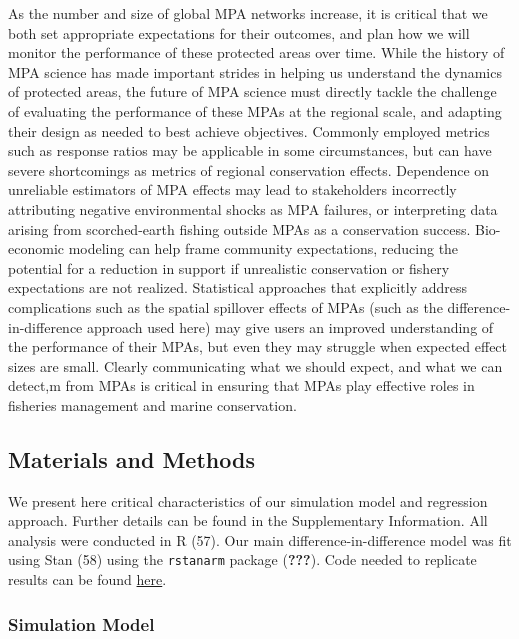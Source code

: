 \documentclass[9pt,twocolumn,twoside,lineno]{pnas-new}
\begin{document}
As the number and size of global MPA networks increase, it is critical
that we both set appropriate expectations for their outcomes, and plan
how we will monitor the performance of these protected areas over time.
While the history of MPA science has made important strides in helping
us understand the dynamics of protected areas, the future of MPA science
must directly tackle the challenge of evaluating the performance of
these MPAs at the regional scale, and adapting their design as needed to
best achieve objectives. Commonly employed metrics such as response
ratios may be applicable in some circumstances, but can have severe
shortcomings as metrics of regional conservation effects. Dependence on
unreliable estimators of MPA effects may lead to stakeholders
incorrectly attributing negative environmental shocks as MPA failures,
or interpreting data arising from scorched-earth fishing outside MPAs as
a conservation success. Bio-economic modeling can help frame community
expectations, reducing the potential for a reduction in support if
unrealistic conservation or fishery expectations are not realized.
Statistical approaches that explicitly address complications such as the
spatial spillover effects of MPAs (such as the difference-in-difference
approach used here) may give users an improved understanding of the
performance of their MPAs, but even they may struggle when expected
effect sizes are small. Clearly communicating what we should expect, and
what we can detect,m from MPAs is critical in ensuring that MPAs play
effective roles in fisheries management and marine conservation.

\hypertarget{materials-and-methods}{%
\subsection{Materials and Methods}\label{materials-and-methods}}

We present here critical characteristics of our simulation model and
regression approach. Further details can be found in the Supplementary
Information. All analysis were conducted in R (57). Our main
difference-in-difference model was fit using Stan (58) using the
\texttt{rstanarm} package ({\textbf{???}}). Code needed to replicate
results can be found
\href{https://github.com/DanOvando/regional-effects-of-mpas}{here}.

\hypertarget{simulation-model}{%
\subsubsection{Simulation Model}\label{simulation-model}}
\end{document}
